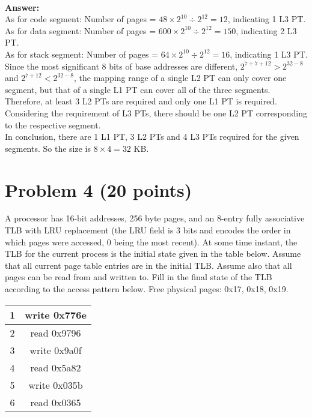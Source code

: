 \documentclass[answers]{exam}
\begin{document}
\\
\textbf{Answer:}\\
As for code segment: Number of pages = $48\times 2^{10}\div 2^{12}=12$, indicating 1 L3 PT.\\
As for data segment: Number of pages = $600\times 2^{10}\div 2^{12}=150$, indicating 2 L3 PT.\\
As for stack segment: Number of pages = $64\times 2^{10}\div 2^{12}=16$, indicating 1 L3 PT.\\
Since the most significant 8 bits of base addresses are different, $2^{7+7+12}>2^{32-8}$ and $2^{7+12}<2^{32-8}$, the mapping range of a single L2 PT can only cover one segment, but that of a single L1 PT can cover all of the three segments. Therefore, at least 3 L2 PTs are required and only one L1 PT is required.\\
Considering the requirement of L3 PTs, there should be one L2 PT corresponding to the respective segment.\\
In conclusion, there are 1 L1 PT, 3 L2 PTs and 4 L3 PTs required for the given segments. So the size is $8\times 4=32$ KB.


\newpage
\section*{Problem 4 (20 points)}
A processor has 16-bit addresses, 256 byte pages, and an 8-entry fully associative TLB with LRU replacement (the LRU field is 3 bits and encodes the order in which pages were accessed, 0 being the most recent). At some time instant, the TLB for the current process is the initial state given in the table below. Assume that all current page table entries are in the initial TLB. Assume also that all pages can be read from and written to. Fill in the final state of the TLB according to the access pattern below. Free physical pages: 0x17, 0x18, 0x19.

\begin{table}[h!]
  \begin{center}
  \setlength{\tabcolsep}{7mm}
    \begin{tabular}{|c|c|} 
      \hline
      1&write 0x776e\\
      \hline
      2&read 0x9796\\
      \hline
      3&write 0x9a0f\\
      \hline
      4&read 0x5a82\\
      \hline
      5&write 0x035b\\
      \hline
      6&read 0x0365\\
      \hline
    \end{tabular}
  \end{center}
\end{table}
\end{document}
